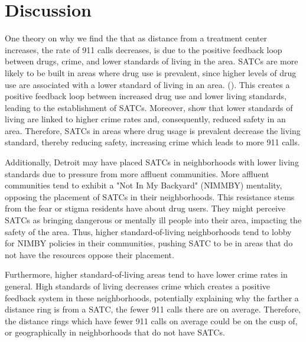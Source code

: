 \documentclass[12pt]{article}
\begin{document}
\break
\section{Discussion}
\label{sec:discussion}

One theory on why we find the that as distance from a treatment center increases, the rate of 911 calls decreases, is due to the positive feedback loop between drugs, crime, and lower standards of living in the area. SATCs are more likely to be built in areas where drug use is prevalent, since higher levels of drug use are associated with a lower standard of living in an area. (\cite{drugs_and_crime}). This creates a positive feedback loop between increased drug use and lower living standards, leading to the establishment of SATCs. Moreover, \cite{drugs_and_crime} show that lower standards of living are linked to higher crime rates and, consequently, reduced safety in an area. Therefore, SATCs in areas where drug usage is prevalent decrease the living standard, thereby reducing safety, increasing crime which leads to more 911 calls.  

Additionally, Detroit may have placed SATCs in neighborhoods with lower living standards due to pressure from more affluent communities. More affluent communities tend to exhibit a "Not In My Backyard" (NIMMBY) mentality, opposing the placement of SATCs in their neighborhoods. This resistance stems from the fear or stigma residents have about drug users. They might perceive SATCs as bringing dangerous or mentally ill people into their area, impacting the safety of the area. Thus, higher standard-of-living neighborhoods tend to lobby for NIMBY policies in their communities, pushing SATC to be in areas that do not have the resources oppose their placement.

Furthermore, higher standard-of-living areas tend to have lower crime rates in general. High standards of living decreases crime which creates a positive feedback system in these neighborhoods, potentially explaining why the farther a distance ring is from a SATC, the fewer 911 calls there are on average. Therefore, the distance rings which have fewer 911 calls on average could be on the cusp of, or geographically in neighborhoods that do not have SATCs. 
    
\end{document}
